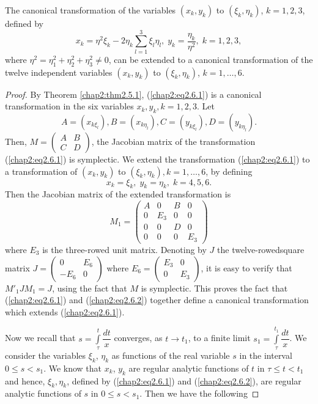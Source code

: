 \setcounter{subtheorem}{0}
\begin{subtheorem}\label{chap2:thm2.6.1}
The canonical transformation of the variables $(x_k, y_k)$ to $(\xi_k, \eta_k)$, $k = 1,2,3$, defined by
\begin{equation*}
x_k = \eta^2 \xi_k - 2 \eta_k \sum\limits^3_{l=1} \xi_l \eta_l, \; y_k = \frac{\eta_k}{\eta^2}, \; k = 1,2,3, \tag{2.6.1}\label{chap2:eq2.6.1} 
\end{equation*}
where $\eta^2 = \eta^2_1 + \eta^2_2 + \eta^2_3 \neq 0$, can be extended to a canonical transformation of the twelve independent variables $(x_k, y_k)$ to $(\xi_k, \eta_k)$, $k =1 ,\ldots, 6$.
\end{subtheorem}

\begin{proof}
By Theorem \ref{chap2:thm2.5.1}, (\ref{chap2:eq2.6.1}) is a canonical transformation in the six variables $x_k , y_k, k = 1,2,3$. Let
$$
A = (x_{k \xi_l}), B = (x_{k \eta_l}), C = (y_{k\xi_l}), D = (y_{k \eta_l}). 
$$
Then, $M = \left(\begin{matrix} 
A & B \\ C & D\end{matrix}\right)$, the Jacobian matrix of the transformation (\ref{chap2:eq2.6.1}) is symplectic. We extend the transformation (\ref{chap2:eq2.6.1}) to a transformation of $(x_k,y_k)$ to $(\xi_k, \eta_k), k = 1, \ldots, 6$, by defining
\begin{equation*}
x_k = \xi_k, \; y_k = \eta_k, \; k = 4,5,6.\tag{2.6.2}\label{chap2:eq2.6.2} 
\end{equation*}
Then the Jacobian matrix of the extended transformation is 
$$
M_1 = 
\begin{pmatrix}
A & 0 & B & 0 \\
0 & E_3 & 0 & 0\\
0 & 0 & D & 0 \\
0 & 0 & 0 & E_3
\end{pmatrix}
$$
where $E_3$ is the three-rowed unit matrix. Denoting by $J$ the twelve-rowed\pageoriginale square matrix $J = \left(\begin{matrix}
0 & E_6 \\ - E_6 & 0\end{matrix}\right)$ where $E_6 = \left(\begin{matrix}
E_3 & 0 \\0 & E_3\end{matrix} \right)$, it is easy to verify that $M'_1 J M_1 = J$, using the fact that $M$ is symplectic. This proves the fact that (\ref{chap2:eq2.6.1}) and (\ref{chap2:eq2.6.2}) together define a canonical transformation which extends (\ref{chap2:eq2.6.1}).

Now we recall that $s = \int\limits^t_{\tau} \dfrac{dt}{x}$ converges, as $t \to t_1$, to a finite limit $s_1 = \int\limits^{t_1}_{\tau} \dfrac{dt}{x}$. We consider the variables $\xi_k$, $\eta_k$ as functions of the real variable $s$ in the interval $0 \leq s < s_1$. We know that $x_k$, $y_k$ are regular analytic functions of $t$ in $\tau \leq t < t_1$ and hence, $\xi_k, \eta_k$, defined by (\ref{chap2:eq2.6.1}) and (\ref{chap2:eq2.6.2}), are regular analytic functions of $s$ in $0 \leq s <s_1$. Then we have the following
\end{proof}

